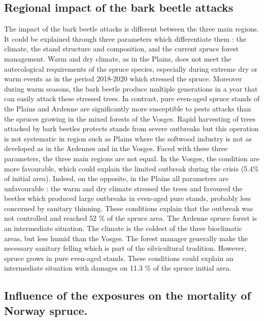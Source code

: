 \documentclass[3p,procedia]{elsarticle}
\begin{document}
\subsection{Regional impact of the bark beetle attacks}
The  impact of the bark beetle attacks is different between the three main regions.
It could be explained through three parameters which differentiate them : the climate, the stand structure and composition, and the current spruce forest management.
Warm and dry climate, as in the Plains, does not meet the autecological requirements of the spruce species, especially during extreme dry or warm events as in the period 2018-2020 \citep{rousi_accelerated_2022} which stressed the spruce. Moreover during warm seasons, the bark beetle produce multiple generations in a year \citep{annila_influence_1969,baier_phenipscomprehensive_2007} that can easily attack these stressed trees.
In contrast, pure even-aged spruce stands of the Plains and Ardenne are significantly more susceptible to pests attacks \citep{faccoli_composition_2014,jactel_2021} than the spruces growing in the mixed forests of the Vosges.
Rapid harvesting of trees attacked by bark beetles protects stands from severe outbreaks \citep{stadelmann_effects_2013} but this operation is not systematic in region such as Plains where the softwood industry is not as developed as in the Ardennes and in the Vosges.
Faced with these three parameters, the three main regions are not equal.
In the Vosges, the condition are more favourable, which could explain the limited outbreak during the crisis (5.4\% of initial area).
Indeed, on the opposite, in the Plains all parameters are unfavourable : the warm and dry climate stressed the trees and favoured the beetles which produced large outbreaks in even-aged pure stands, probably less concerned by sanitary thinning. 
These conditions explain that the outbreak was not controlled and reached 52 \% of the spruce area.
The Ardenne spruce forest is an intermediate situation.
The climate is the coldest of the three bioclimatic areas, but less humid than the Vosges.
The forest manager generally make the necessary sanitary felling which is part of the silvicultural tradition.
However, spruce grows in pure even-aged stands.
These conditions could explain an intermediate situation with damages on 11.3 \% of the spruce initial area.


\subsection{Influence of the exposures on the mortality of Norway spruce.}
\end{document}
